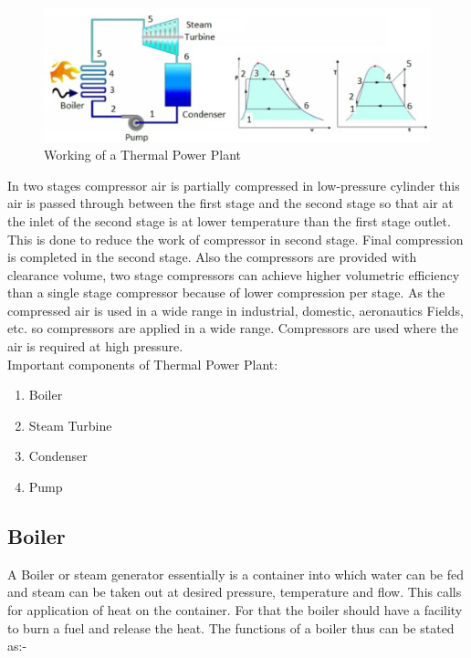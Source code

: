 \documentclass[11pt]{article}
\begin{document}
\begin{figure}[H]
	\centering
	\includegraphics[scale=0.28]{Thermal Power Plant.jpg}
	\caption{Working of a Thermal Power Plant}
	\label{tpp}
\end{figure}


In two stages compressor air is partially compressed in low-pressure cylinder this air is
passed through between the first stage and the second stage so that air at the inlet of the second stage is at lower temperature than the first stage outlet. This is done to reduce the work of compressor in second stage. Final compression is completed in the second stage. Also the compressors are provided with clearance volume, two stage compressors can achieve higher volumetric efficiency than a single stage compressor because of lower compression per stage. As the compressed air is used in a wide range in industrial, domestic, aeronautics Fields, etc. so compressors are applied in a wide range. Compressors are used where the air is required at high pressure.\\


Important components of Thermal Power Plant:

\begin{enumerate}
	\item Boiler
	\item Steam Turbine
	\item Condenser
	\item Pump
\end{enumerate}

\subsection{Boiler}
A Boiler or steam generator essentially is a container into which water can
be fed and steam can be taken out at desired pressure, temperature and flow. This calls for
application of heat on the container. For that the boiler should have a facility to burn a fuel and release the heat. The functions of a boiler thus can be stated as:-
\end{document}
